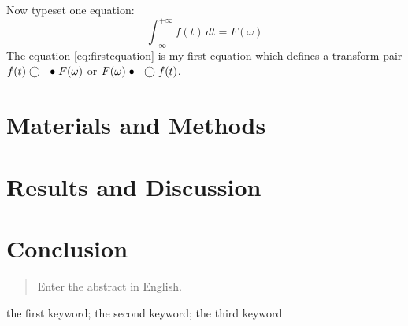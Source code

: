 \documentclass[masterthesis]{fer}
\begin{document}
Now typeset one equation:
\begin{equation}
  \label{eq:firstequation}
  \int_{-\infty}^{+\infty}f(t)\,dt=F(\omega)
\end{equation}
The equation \eqref{eq:firstequation} is my first equation which defines a transform pair $f(t)\ufrek F(\omega)$ or $F(\omega)\uvrem f(t)$.


\chapter{Materials and Methods}
\label{sec:materialsandmethods}

\Blindtext


\chapter{Results and Discussion}
\label{sec:results_and_discussion}

\Blindtext


\chapter{Conclusion}
\label{chp:conclusion}

\blindtext








\begin{abstract}
  Enter the abstract in English.
  
  \blindtext 
\end{abstract}

\begin{keywords}
  the first keyword; the second keyword; the third keyword
\end{keywords}
\end{document}
